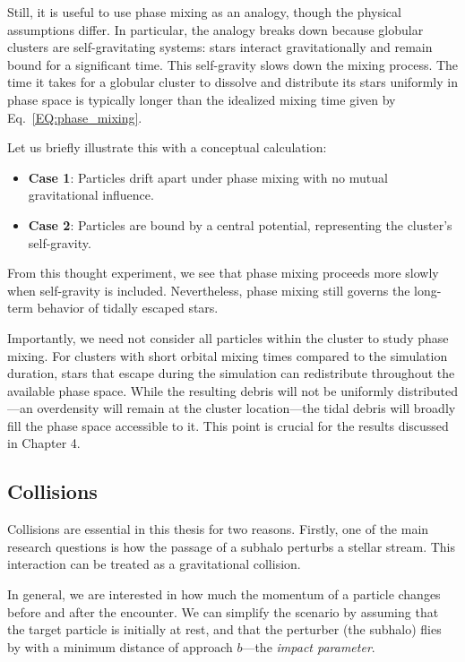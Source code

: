             Still, it is useful to use phase mixing as an analogy, though the physical assumptions differ. In particular, the analogy breaks down because globular clusters are self-gravitating systems: stars interact gravitationally and remain bound for a significant time. This self-gravity slows down the mixing process. The time it takes for a globular cluster to dissolve and distribute its stars uniformly in phase space is typically longer than the idealized mixing time given by Eq.~\ref{EQ:phase_mixing}.

            Let us briefly illustrate this with a conceptual calculation:

            \begin{itemize}
                \item \textbf{Case 1}: Particles drift apart under phase mixing with no mutual gravitational influence.
                \item \textbf{Case 2}: Particles are bound by a central potential, representing the cluster's self-gravity.
            \end{itemize}
            From this thought experiment, we see that phase mixing proceeds more slowly when self-gravity is included. Nevertheless, phase mixing still governs the long-term behavior of tidally escaped stars.

            Importantly, we need not consider all particles within the cluster to study phase mixing. For clusters with short orbital mixing times compared to the simulation duration, stars that escape during the simulation can redistribute throughout the available phase space. While the resulting debris will not be uniformly distributed—an overdensity will remain at the cluster location—the tidal debris will broadly fill the phase space accessible to it. This point is crucial for the results discussed in Chapter 4.

            
    \subsection{Collisions}

        Collisions are essential in this thesis for two reasons. Firstly, one of the main research questions is how the passage of a subhalo perturbs a stellar stream. This interaction can be treated as a gravitational collision.

        In general, we are interested in how much the momentum of a particle changes before and after the encounter. We can simplify the scenario by assuming that the target particle is initially at rest, and that the perturber (the subhalo) flies by with a minimum distance of approach $b$—the \emph{impact parameter}.

